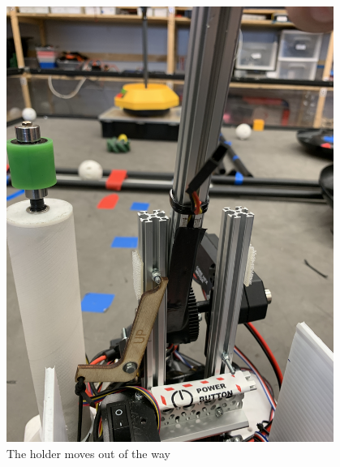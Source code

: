 \begin{figure}[ht]
\centering
\begin{minipage}[b]{.48\textwidth}
  \centering
  \includegraphics[width=0.95\textwidth]{Meetings/November/11-08-21/11-8-21_Hardware_Figure3 - Nathan Forrer.JPG}
  \caption{The holder moves out of the way}
  \label{fig:pic3}
\end{minipage}%
\hfill%
\begin{minipage}[b]{.48\textwidth}
  \centering

\end{minipage}
\end{figure}
